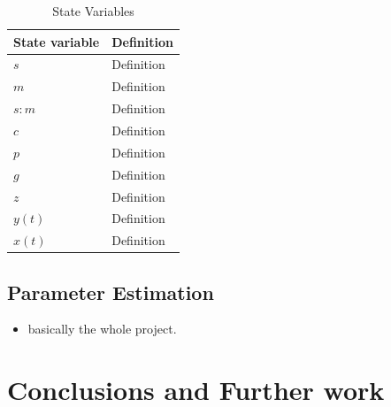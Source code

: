 \documentclass[10pt,journal]{./IEEE_latex_class/IEEEtran}
\begin{document}
\begin{table}
\renewcommand{\arraystretch}{1.3}
\caption{State Variables}
\label{StateVariables}
\centering
\begin{tabular}{| l | l |}
\hline State variable &  Definition  \\
\hline\hline $s$ &  Definition  \\
\hline $m$ &  Definition  \\
\hline $s:m$ &  Definition  \\
\hline $c$ &  Definition  \\
\hline $p$ &  Definition  \\
\hline $g$ &  Definition  \\
\hline $z$ &  Definition  \\
\hline $y(t)$ &  Definition  \\
\hline $x(t)$ &  Definition  \\
\hline
\end{tabular}
\end{table}



\subsection{Parameter Estimation}
 \begin{itemize}
\item basically the whole project.
\cite{Isaacs2006}
 \end{itemize}
 
\section{Conclusions and Further work}
\label{Conclusions and Further work}




\end{document}
